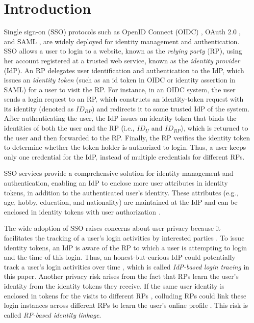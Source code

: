 \section{Introduction}
\label{sec:intro}
Single sign-on (SSO) protocols such as OpenID Connect (OIDC) \cite{OpenIDConnect}, OAuth 2.0 \cite{rfc6749}, and SAML \cite{SAML, SAMLIdentifier}, are widely deployed for identity management and authentication.
SSO allows a user to login to a website,
 known as the \emph{relying party} (RP), using her account registered at a trusted web service, known as the \emph{identity provider} (IdP).
An RP delegates user identification and authentication to the IdP, which issues an \emph{identity token} (such as an id token in OIDC or identity assertion in SAML) for a user to visit the RP. %
For instance, in an OIDC system, the user sends a login request to an RP,
which constructs an identity-token request with its identity (denoted as $ID_{RP}$) and redirects it to some trusted IdP of the system.
After authenticating the user, the IdP issues an identity token that binds the identities of both the user and the RP (i.e., $ID_U$ and $ID_{RP}$), which is returned to the user and then forwarded to the RP.
Finally, the RP verifies the identity token to determine whether the token holder is authorized to login.
Thus, a user keeps only one credential for the IdP, instead of multiple credentials for different RPs.

SSO services provide a comprehensive solution for identity management and authentication, enabling an IdP to enclose more user attributes in identity tokens, in addition to the authenticated user's identity.
These attributes (e.g., age, hobby, education, and nationality) are maintained at the IdP
 and can be enclosed in identity tokens with user authorization \cite{OpenIDConnect,rfc6749}.

The wide adoption of SSO raises concerns about user privacy because it facilitates the tracking of a user's login activities by interested parties \cite{NIST2017draft, SPRESSO, BrowserID, maler2008venn}.
To issue identity tokens, %
 an IdP is aware of the RP to which a user is attempting to login and the time of this login.
Thus, an honest-but-curious IdP could potentially track a user's login activities over time \cite{BrowserID,SPRESSO},
which is called {\em IdP-based login tracing} in this paper.
Another privacy risk arises from the fact that RPs learn the user's identity from the identity tokens they receive.
If the same user identity is enclosed in tokens for the visits to different RPs \cite{maler2008venn, Google, FirefoxAccount}, colluding RPs could link these login instances across different RPs %
to learn the user's online profile \cite{maler2008venn}.
This risk is called {\em RP-based identity linkage}.


